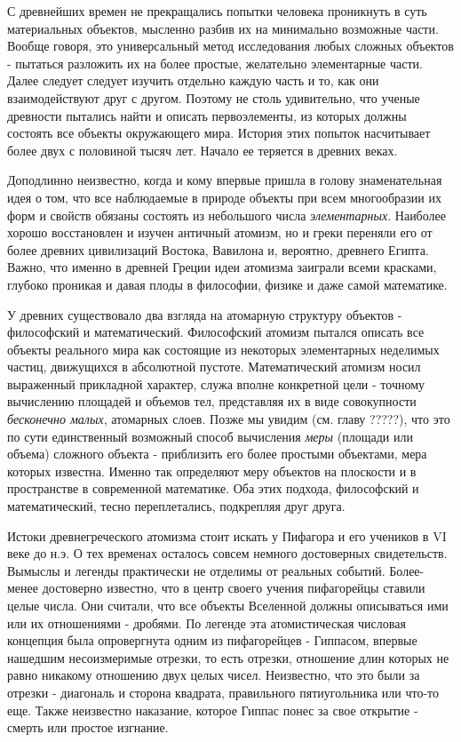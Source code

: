 С древнейших времен не прекращались попытки человека проникнуть в суть материальных объектов, мысленно разбив их на минимально возможные части.
Вообще говоря, это универсальный метод исследования любых сложных объектов - пытаться разложить их на более простые, желательно элементарные части. 
Далее следует следует изучить отдельно каждую часть и то, как они взаимодействуют друг с другом.
Поэтому не столь удивительно, что ученые древности пытались найти и описать первоэлементы, из которых должны состоять все объекты окружающего мира.
История этих попыток насчитывает более двух с половиной тысяч лет.
Начало ее теряется в древних веках.

Доподлинно неизвестно, когда и кому впервые пришла в голову знаменательная идея о том, что все наблюдаемые в природе объекты при всем многообразии их форм и свойств обязаны состоять из небольшого числа \textit{элементарных}.
Наиболее хорошо восстановлен и изучен античный атомизм, но и греки переняли его от более древних цивилизаций Востока, Вавилона и, вероятно, древнего Египта.
Важно, что именно в древней Греции идеи атомизма заиграли всеми красками, глубоко проникая и давая плоды в философии, физике и даже самой математике.

У древних существовало два взгляда на атомарную структуру объектов - философский и математический.
Философский атомизм пытался описать все объекты реального мира как состоящие из некоторых элементарных неделимых частиц, движущихся в абсолютной пустоте.
Математический атомизм носил выраженный прикладной характер, служа вполне конкретной цели - точному вычислению площадей и объемов тел, представляя их в виде совокупности \textit{бесконечно малых}, атомарных слоев.
Позже мы увидим (см. главу ?????), что это по сути единственный возможный способ вычисления \textit{меры} (площади или объема) сложного объекта - приблизить его более простыми объектами, мера которых известна.
Именно так определяют меру объектов на плоскости и в пространстве в современной математике.
Оба этих подхода, философский и математический, тесно переплетались, подкрепляя друг друга.

Истоки древнегреческого атомизма стоит искать у Пифагора и его учеников в VI веке до н.э. 
О тех временах осталось совсем немного достоверных свидетельств.
Вымыслы и легенды практически не отделимы от реальных событий.
Более-менее достоверно известно, что в центр своего учения пифагорейцы ставили целые числа.
Они считали, что все объекты Вселенной должны описываться ими или их отношениями - дробями.
По легенде эта атомистическая числовая концепция была опровергнута одним из пифагорейцев - Гиппасом, впервые нашедшим несоизмеримые отрезки, то есть отрезки, отношение длин которых не равно никакому отношению двух целых чисел.
Неизвестно, что это были за отрезки - диагональ и сторона квадрата, правильного пятиугольника или что-то еще.
Также неизвестно наказание, которое Гиппас понес за свое открытие - смерть или простое изгнание.   

